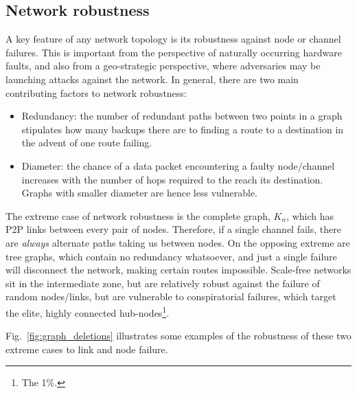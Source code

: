 \subsection{Network robustness}

A key feature of any network topology is its robustness against node or channel failures. This is important from the perspective of naturally occurring hardware faults, and also from a geo-strategic perspective, where adversaries may be launching attacks against the network. In general, there are two main contributing factors to network robustness:
\begin{itemize}
	\item Redundancy: the number of redundant paths between two points in a graph stipulates how many backups there are to finding a route to a destination in the advent of one route failing.
	\item Diameter: the chance of a data packet encountering a faulty node/channel increases with the number of hops required to the reach its destination. Graphs with smaller diameter are hence less vulnerable.
\end{itemize}

The extreme case of network robustness is the complete graph, $K_n$, which has P2P links between every pair of nodes. Therefore, if a single channel fails, there are \textit{always} alternate paths taking us between nodes. On the opposing extreme are tree graphs, which contain no redundancy whatsoever, and just a single failure will disconnect the network, making certain routes impossible. Scale-free networks sit in the intermediate zone, but are relatively robust against the failure of random nodes/links, but are vulnerable to conspiratorial failures, which target the elite, highly connected hub-nodes\footnote{The 1\%.}.

Fig.~\ref{fig:graph_deletions} illustrates some examples of the robustness of these two extreme cases to link and node failure.


